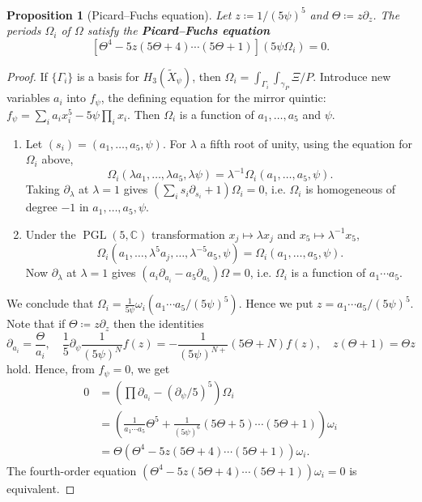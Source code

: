\documentclass{report}
\theoremstyle{plain}
\newtheorem{proposition}[theorem]{Proposition}
\theoremstyle{definition}
\theoremstyle{remark}
\newcommand{\di}{\partial}
\newcommand{\bC}{\mathbb{C}}
\DeclareMathOperator{\PGL}{PGL}
\begin{document}
\begin{proposition}[Picard--Fuchs equation] \label{thm:picard-fuchs-equation}
  Let $z \coloneqq 1/(5\psi)^5$ and $\Theta \coloneqq z\di_z$. The
  periods $\Omega_i$ of $\Omega$ satisfy the {\bf Picard--Fuchs
    equation}
  \[ [\Theta^4 - 5z(5\Theta+4)\cdots(5\Theta+1)](5\psi\Omega_i) = 0. \]
\end{proposition}

\begin{proof}
  If $\{\Gamma_i\}$ is a basis for $H_3(\tilde{X}_\psi)$, then
  $\Omega_i = \int_{\Gamma_i} \int_{\gamma_P} \Xi/P$. Introduce new
  variables $a_i$ into $f_\psi$, the defining equation for the mirror
  quintic: $f_\psi = \sum_i a_i x_i^5 - 5\psi \prod_i x_i$. Then
  $\Omega_i$ is a function of $a_1, \ldots, a_5$ and $\psi$.
  \begin{enumerate}
  \item Let $(s_i) = (a_1, \ldots, a_5, \psi)$. For $\lambda$ a fifth
    root of unity, using the equation for $\Omega_i$ above,
    \[ \Omega_i(\lambda a_1, \ldots, \lambda a_5, \lambda \psi) = \lambda^{-1}\Omega_i(a_1, \ldots, a_5, \psi). \]
    Taking $\di_\lambda$ at $\lambda = 1$ gives $(\sum_i s_i \di_{s_i}
    + 1)\Omega_i = 0$, i.e. $\Omega_i$ is homogeneous of degree $-1$
    in $a_1, \ldots, a_5, \psi$.
  \item Under the $\PGL(5, \bC)$ transformation $x_j \mapsto \lambda
    x_j$ and $x_5 \mapsto \lambda^{-1}x_5$,
    \[ \Omega_i(a_1, \ldots, \lambda^5a_j, \ldots, \lambda^{-5}a_5, \psi) = \Omega_i(a_1, \ldots, a_5, \psi). \]
    Now $\di_\lambda$ at $\lambda = 1$ gives $(a_i \di_{a_i} - a_5
    \di_{a_5})\Omega = 0$, i.e. $\Omega_i$ is a function of $a_1
    \cdots a_5$.
  \end{enumerate}
  We conclude that $\Omega_i = \frac{1}{5\psi} \omega_i(a_1\cdots
  a_5/(5\psi)^5)$. Hence we put $z = a_1\cdots a_5/(5\psi)^5$. Note
  that if $\Theta \coloneqq z\di_z$ then the identities
  \[ \di_{a_i} = \frac{\Theta}{a_i}, \quad \frac{1}{5}\di_\psi \frac{1}{(5\psi)^N} f(z) = -\frac{1}{(5\psi)^{N+}} (5\Theta + N) f(z), \quad z(\Theta+1) = \Theta z \]
  hold. Hence, from $f_\psi = 0$, we get
  \begin{align*}
    0
    &= \left(\prod \di_{a_i} - (\di_\psi/5)^5\right) \Omega_i \\
    &= \left(\frac{1}{a_1 \cdots a_5} \Theta^5 + \frac{1}{(5\psi)^6}(5\Theta+5) \cdots (5\Theta+1)\right) \omega_i \\
    &= \Theta(\Theta^4 - 5z(5\Theta+4)\cdots (5\Theta+1)) \omega_i.
  \end{align*}
  The fourth-order equation $(\Theta^4 - 5z(5\Theta+4)\cdots
  (5\Theta+1)) \omega_i = 0$ is equivalent.
\end{proof}
\end{document}
